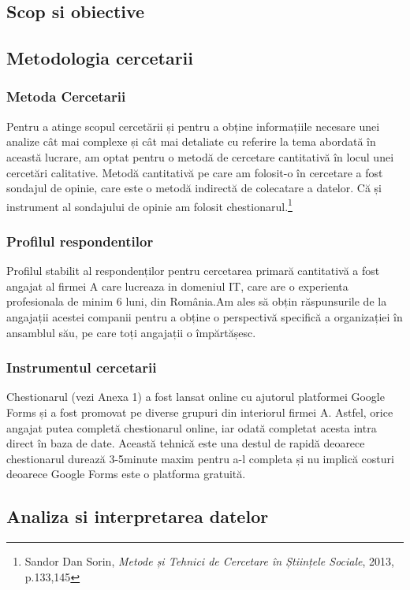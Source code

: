 \documentclass[a4paper, 12pt]{article}
\begin{document}
	\subsection{Scop si obiective}

	\subsection{Metodologia cercetarii}
		\subsubsection{Metoda Cercetarii}
	\qquad\space Pentru a atinge scopul cercetării și pentru a obține informațiile necesare unei analize cât mai complexe și cât mai detaliate cu referire la tema abordată în această lucrare, am optat pentru o metodă de cercetare cantitativă în locul unei cercetări calitative.
	\quad Metodă cantitativă pe care am folosit-o în cercetare a fost sondajul de opinie, care este o metodă indirectă de colecatare a datelor. Că și instrument al sondajului de opinie am folosit chestionarul.\footnote{Sandor Dan Sorin, \textit{Metode și Tehnici de Cercetare în Științele Sociale}, 2013, p.133,145}
		\subsubsection{Profilul respondentilor}
	\quad Profilul stabilit al respondenților pentru cercetarea primară cantitativă a fost angajat al firmei A care lucreaza in domeniul IT, care are  o experienta profesionala de minim 6 luni, din România.Am ales să obțin răspunsurile de la angajații acestei companii pentru a obține o perspectivă specifică a organizației în ansamblul său, pe care toți angajații o împărtășesc.
		\subsubsection{Instrumentul cercetarii}
	\quad Chestionarul (vezi Anexa 1) a fost lansat online cu ajutorul platformei Google Forms și a fost promovat  pe diverse grupuri din interiorul firmei A. Astfel, orice angajat putea completă chestionarul online, iar odată completat acesta intra direct în baza de date. Această tehnică este una destul de rapidă deoarece chestionarul durează 3-5minute maxim pentru a-l completa și nu implică costuri deoarece Google Forms este o platforma gratuită.

	\subsection{Analiza si interpretarea datelor}
\end{document}
